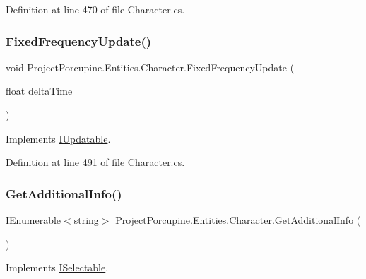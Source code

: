 Definition at line 470 of file Character.\+cs.

\mbox{\label{class_project_porcupine_1_1_entities_1_1_character_a9ac39404237d8a6f3da2688bc4ab9c13}} 
\subsubsection{\texorpdfstring{Fixed\+Frequency\+Update()}{FixedFrequencyUpdate()}}
{\footnotesize\ttfamily void Project\+Porcupine.\+Entities.\+Character.\+Fixed\+Frequency\+Update (\begin{DoxyParamCaption}\item[{float}]{delta\+Time }\end{DoxyParamCaption})}



Implements \hyperlink{interface_i_updatable_a360da1e579ac8d1ed8adb700176cc45f}{I\+Updatable}.



Definition at line 491 of file Character.\+cs.

\mbox{\label{class_project_porcupine_1_1_entities_1_1_character_a25f40156785cb40c6bfc3496e27262b9}} 
\subsubsection{\texorpdfstring{Get\+Additional\+Info()}{GetAdditionalInfo()}}
{\footnotesize\ttfamily I\+Enumerable$<$string$>$ Project\+Porcupine.\+Entities.\+Character.\+Get\+Additional\+Info (\begin{DoxyParamCaption}{ }\end{DoxyParamCaption})}



Implements \hyperlink{interface_i_selectable_a337f81bfa99bb254bb2f7de6a8b5cd4b}{I\+Selectable}.



